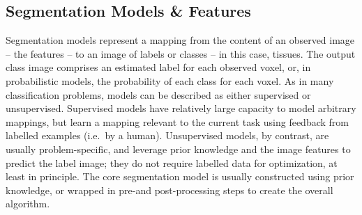 \subsection{Segmentation Models \& Features}\label{ss:prior-models+feats}
Segmentation models represent a mapping
from the content of an observed image -- the features --
to an image of labels or classes -- in this case, tissues.
The output class image comprises an estimated label for each observed voxel,
or, in probabilistic models, the probability of each class for each voxel.
As in many classification problems, models can be described as either supervised or unsupervised.
Supervised models have relatively large capacity to model arbitrary mappings,
but learn a mapping relevant to the current task using feedback from labelled examples
(i.e.\ by a human).
Unsupervised models, by contrast, are usually problem-specific,
and leverage prior knowledge and the image features to predict the label image;
they do not require labelled data for optimization, at least in principle.
The core segmentation model is usually constructed using prior knowledge,
or wrapped in pre-and post-processing steps to create the overall algorithm.
